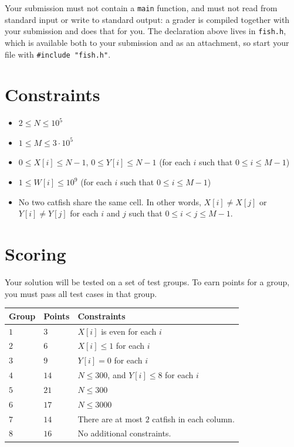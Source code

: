 Your submission must not contain a \texttt{main} function, and must not read from standard input or
write to standard output: a grader is compiled together with your submission and does that for you.
The declaration above lives in \texttt{fish.h}, which is available both to your submission and as an
attachment, so start your file with \texttt{\#include "fish.h"}.

\section*{Constraints}
\begin{itemize}
  \item $2 \leq N \leq 10^5$
  \item $1 \leq M \leq 3 \cdot 10^5$
  \item $0 \leq X[i] \leq N-1$, $0 \leq Y[i] \leq N-1$ (for each $i$ such that
  $0 \leq i \leq M-1$)
  \item $1 \leq W[i] \leq 10^9$ (for each $i$ such that $0 \leq i \leq M-1$)
  \item No two catfish share the same cell. In other words, $X[i] \neq X[j]$ or $Y[i] \neq Y[j]$
  for each $i$ and $j$ such that $0 \leq i < j \leq M-1$.
\end{itemize}

\section*{Scoring}
Your solution will be tested on a set of test groups.
To earn points for a group, you must pass all test cases in that group.

\noindent
\begin{tabular}{| l | l | p{12cm} |}
  \hline
  \textbf{Group} & \textbf{Points} & \textbf{Constraints} \\ \hline
  $1$ & $3$  & $X[i]$ is even for each $i$ \\ \hline
  $2$ & $6$  & $X[i] \leq 1$ for each $i$ \\ \hline
  $3$ & $9$  & $Y[i] = 0$ for each $i$ \\ \hline
  $4$ & $14$ & $N \leq 300$, and $Y[i] \leq 8$ for each $i$ \\ \hline
  $5$ & $21$ & $N \leq 300$ \\ \hline
  $6$ & $17$ & $N \leq 3000$ \\ \hline
  $7$ & $14$ & There are at most $2$ catfish in each column. \\ \hline
  $8$ & $16$ & No additional constraints. \\ \hline
\end{tabular}

